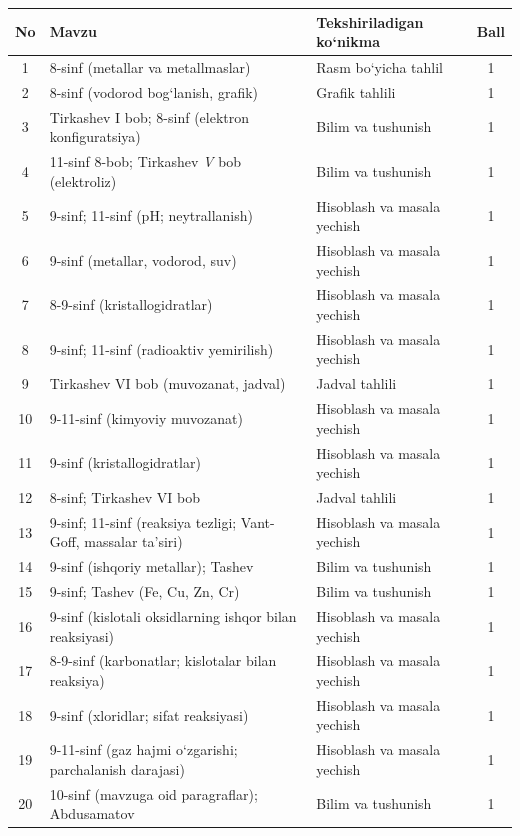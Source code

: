 \documentclass[11pt,a4paper]{article}
\begin{document}
{\small\noindent\begin{longtable}{|c|p{7.2cm}|p{5.4cm}|c|}\hline \textbf{No} & \textbf{Mavzu} & \textbf{Tekshiriladigan ko`nikma} & \textbf{Ball}\\\hline
1 & 8-sinf (metallar va metallmaslar) & Rasm bo`yicha tahlil & 1\\\hline
2 & 8-sinf (vodorod bog`lanish, grafik) & Grafik tahlili & 1\\\hline
3 & Tirkashev I bob; 8-sinf (elektron konfiguratsiya) & Bilim va tushunish & 1\\\hline
4 & 11-sinf 8-bob; Tirkashev \textit{V} bob (elektroliz) & Bilim va tushunish & 1\\\hline
5 & 9-sinf; 11-sinf (pH; neytrallanish) & Hisoblash va masala yechish & 1\\\hline
6 & 9-sinf (metallar, vodorod, suv) & Hisoblash va masala yechish & 1\\\hline
7 & 8-9-sinf (kristallogidratlar) & Hisoblash va masala yechish & 1\\\hline
8 & 9-sinf; 11-sinf (radioaktiv yemirilish) & Hisoblash va masala yechish & 1\\\hline
9 & Tirkashev VI bob (muvozanat, jadval) & Jadval tahlili & 1\\\hline
10 & 9-11-sinf (kimyoviy muvozanat) & Hisoblash va masala yechish & 1\\\hline
11 & 9-sinf (kristallogidratlar) & Hisoblash va masala yechish & 1\\\hline
12 & 8-sinf; Tirkashev VI bob & Jadval tahlili & 1\\\hline
13 & 9-sinf; 11-sinf (reaksiya tezligi; Vant-Goff, massalar ta'siri) & Hisoblash va masala yechish & 1\\\hline
14 & 9-sinf (ishqoriy metallar); Tashev & Bilim va tushunish & 1\\\hline
15 & 9-sinf; Tashev (Fe, Cu, Zn, Cr) & Bilim va tushunish & 1\\\hline
16 & 9-sinf (kislotali oksidlarning ishqor bilan reaksiyasi) & Hisoblash va masala yechish & 1\\\hline
17 & 8-9-sinf (karbonatlar; kislotalar bilan reaksiya) & Hisoblash va masala yechish & 1\\\hline
18 & 9-sinf (xloridlar; sifat reaksiyasi) & Hisoblash va masala yechish & 1\\\hline
19 & 9-11-sinf (gaz hajmi o`zgarishi; parchalanish darajasi) & Hisoblash va masala yechish & 1\\\hline
20 & 10-sinf (mavzuga oid paragraflar); Abdusamatov & Bilim va tushunish & 1\\\hline

\end{longtable}}
\end{document}
